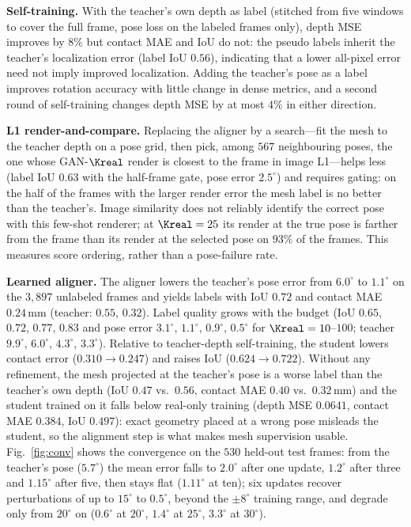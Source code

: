 \noindent\textbf{Self-training.} With the teacher's own depth as label (stitched from five windows to cover the full frame, pose loss on the labeled frames only), depth MSE improves by $8\%$ but contact MAE and IoU do not: the pseudo labels inherit the teacher's localization error (label IoU $0.56$), indicating that a lower all-pixel error need not imply improved localization. Adding the teacher's pose as a label improves rotation accuracy with little change in dense metrics, and a second round of self-training changes depth MSE by at most $4\%$ in either direction.

\noindent\textbf{L1 render-and-compare.} Replacing the aligner by a search---fit the mesh to the teacher depth on a pose grid, then pick, among $567$ neighbouring poses, the one whose GAN-$\Kreal$ render is closest to the frame in image L1---helps less (label IoU $0.63$ with the half-frame gate, pose error $2.5^\circ$) and requires gating: on the half of the frames with the larger render error the mesh label is no better than the teacher's. Image similarity does not reliably identify the correct pose with this few-shot renderer; at $\Kreal=25$ its render at the true pose is farther from the frame than its render at the selected pose on $93\%$ of the frames. This measures score ordering, rather than a pose-failure rate.

\noindent\textbf{Learned aligner.} The aligner lowers the teacher's pose error from $6.0^\circ$ to $1.1^\circ$ on the $3{,}897$ unlabeled frames and yields labels with IoU $0.72$ and contact MAE $0.24\,$mm (teacher: $0.55$, $0.32$). Label quality grows with the budget (IoU $0.65$, $0.72$, $0.77$, $0.83$ and pose error $3.1^\circ$, $1.1^\circ$, $0.9^\circ$, $0.5^\circ$ for $\Kreal=10$--$100$; teacher $9.9^\circ$, $6.0^\circ$, $4.3^\circ$, $3.3^\circ$). Relative to teacher-depth self-training, the student lowers contact error ($0.310\!\to\!0.247$) and raises IoU ($0.624\!\to\!0.722$). Without any refinement, the mesh projected at the teacher's pose is a worse label than the teacher's own depth (IoU $0.47$ vs.\ $0.56$, contact MAE $0.40$ vs.\ $0.32\,$mm) and the student trained on it falls below real-only training (depth MSE $0.0641$, contact MAE $0.384$, IoU $0.497$): exact geometry placed at a wrong pose misleads the student, so the alignment step is what makes mesh supervision usable. Fig.~\ref{fig:conv} shows the convergence on the $530$ held-out test frames: from the teacher's pose ($5.7^\circ$) the mean error falls to $2.0^\circ$ after one update, $1.2^\circ$ after three and $1.15^\circ$ after five, then stays flat ($1.11^\circ$ at ten); six updates recover perturbations of up to $15^\circ$ to $0.5^\circ$, beyond the $\pm8^\circ$ training range, and degrade only from $20^\circ$ on ($0.6^\circ$ at $20^\circ$, $1.4^\circ$ at $25^\circ$, $3.3^\circ$ at $30^\circ$).


